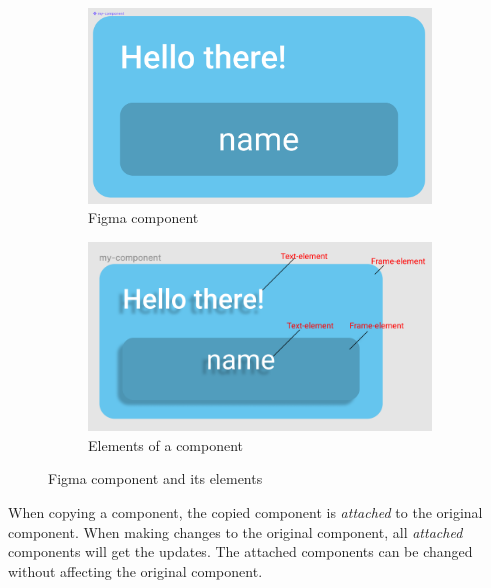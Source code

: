 \begin{figure}[H]
  \centering
  \begin{subfigure}[b]{0.48\textwidth}
    \centering
    \includegraphics[width=\linewidth]{images/cardComp.png}
    \caption{Figma component}
    \label{fig:images/cardComp}
  \end{subfigure}
  \hfill
  \begin{subfigure}[b]{0.48\textwidth}
    \centering
    \includegraphics[width=\linewidth]{images/cardCompElements.png}
    \caption{Elements of a component}
    \label{fig:images/cardCompElements}
  \end{subfigure}
  \caption{Figma component and its elements}
  \label{fig:figmaComponent}
\end{figure}

When copying a \gls{component}, the copied \gls{component} is \textit{attached} to the original \gls{component}. When making changes to the original \gls{component}, all \textit{attached} \glspl{component} will get the updates. The attached \glspl{component} can be changed without affecting the original \gls{component}. 

